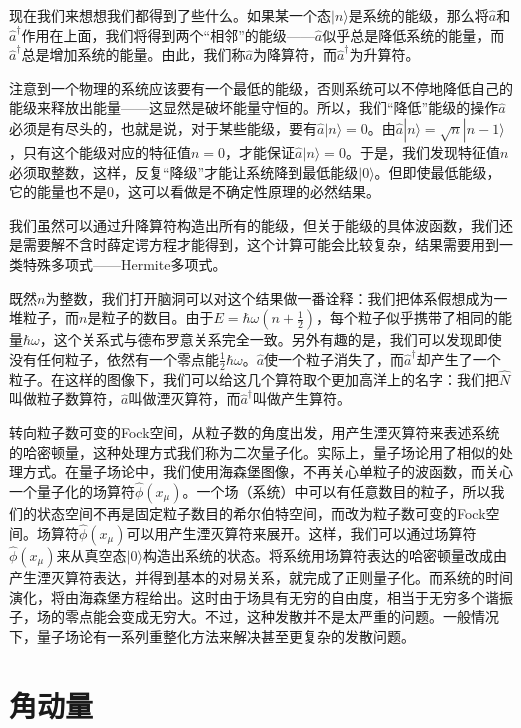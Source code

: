 \documentclass{ctexart}
\begin{document}
现在我们来想想我们都得到了些什么。如果某一个态$|n\rangle$是系统的能级，那么将$\hat{a}$和$\hat{a}^\dagger$作用在上面，我们将得到两个“相邻”的能级——$\hat{a}$似乎总是降低系统的能量，而$\hat{a}^\dagger$总是增加系统的能量。由此，我们称$\hat{a}$为降算符，而$\hat{a}^\dagger$为升算符。

注意到一个物理的系统应该要有一个最低的能级，否则系统可以不停地降低自己的能级来释放出能量——这显然是破坏能量守恒的。所以，我们“降低”能级的操作$\hat{a}$必须是有尽头的，也就是说，对于某些能级，要有$\hat{a}|n\rangle=0$。由$\hat{a}|n\rangle=\sqrt{n}|n-1\rangle$，只有这个能级对应的特征值$n=0$，才能保证$\hat{a}|n\rangle=0$。于是，我们发现特征值$n$必须取整数，这样，反复“降级”才能让系统降到最低能级$|0\rangle$。但即使最低能级，它的能量也不是$0$，这可以看做是不确定性原理的必然结果。

我们虽然可以通过升降算符构造出所有的能级，但关于能级的具体波函数，我们还是需要解不含时薛定谔方程才能得到，这个计算可能会比较复杂，结果需要用到一类特殊多项式——Hermite多项式。

既然$n$为整数，我们打开脑洞可以对这个结果做一番诠释：我们把体系假想成为一堆粒子，而$n$是粒子的数目。由于$E=\hbar\omega\left(n+\frac{1}{2}\right)$，每个粒子似乎携带了相同的能量$\hbar\omega$，这个关系式与德布罗意关系完全一致。另外有趣的是，我们可以发现即使没有任何粒子，依然有一个零点能$\frac{1}{2}\hbar\omega$。$\hat{a}$使一个粒子消失了，而$\hat{a}^\dagger$却产生了一个粒子。在这样的图像下，我们可以给这几个算符取个更加高洋上的名字：我们把$\hat{N}$叫做粒子数算符，$\hat{a}$叫做湮灭算符，而$\hat{a}^\dagger$叫做产生算符。

转向粒子数可变的Fock空间，从粒子数的角度出发，用产生湮灭算符来表述系统的哈密顿量，这种处理方式我们称为二次量子化。实际上，量子场论用了相似的处理方式。在量子场论中，我们使用海森堡图像，不再关心单粒子的波函数，而关心一个量子化的场算符$\hat{\phi}(x_\mu)$。一个场（系统）中可以有任意数目的粒子，所以我们的状态空间不再是固定粒子数目的希尔伯特空间，而改为粒子数可变的Fock空间。场算符$\hat{\phi}(x_\mu)$可以用产生湮灭算符来展开。这样，我们可以通过场算符$\hat{\phi}(x_\mu)$来从真空态$|0\rangle$构造出系统的状态。将系统用场算符表达的哈密顿量改成由产生湮灭算符表达，并得到基本的对易关系，就完成了正则量子化。而系统的时间演化，将由海森堡方程给出。这时由于场具有无穷的自由度，相当于无穷多个谐振子，场的零点能会变成无穷大。不过，这种发散并不是太严重的问题。一般情况下，量子场论有一系列重整化方法来解决甚至更复杂的发散问题。

\section{角动量}
\end{document}
